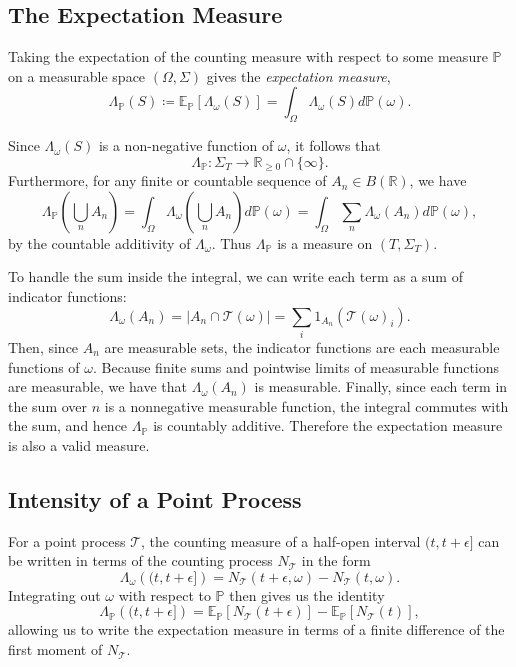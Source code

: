 \documentclass[honours,12pt]{unswthesis}
\numberwithin{equation}{section}
\begin{document}
\subsection{The Expectation Measure}
Taking the expectation of the counting measure with respect to some measure $\mathbb{P}$ on a measurable space $(\Omega,\Sigma)$ gives the \textit{expectation measure},
$$\Lambda_\mathbb{P}(S)\coloneq \mathbb{E}_\mathbb{P}\left[\Lambda_\omega(S)\right] = \int_\Omega \Lambda_\omega(S)d\mathbb{P}(\omega).$$

Since $\Lambda_\omega(S)$ is a non-negative function of $\omega$, it follows that $$\Lambda_{\mathbb{P}} : \Sigma_T \to \mathbb{R}_{\geq 0}\cap\{\infty\}.$$ Furthermore, for any finite or countable sequence of $A_n\in B(\mathbb{R})$, we have $$\Lambda_\mathbb{P}\left(\bigcup_n A_n\right) = \int_\Omega \Lambda_\omega\left(\bigcup_n A_n\right)d\mathbb{P}(\omega) = \int_\Omega \sum_n \Lambda_\omega(A_n) d\mathbb{P}(\omega),$$ by the countable additivity of $\Lambda_\omega$. Thus $\Lambda_\mathbb{P}$ is a measure on $(T,\Sigma_T)$.

To handle the sum inside the integral, we can write each term as a sum of indicator functions:
$$\Lambda_\omega(A_n) = \left\vert A_n\cap \mathcal{T}(\omega)\right\vert = \sum_i 1_{A_n}\left(\mathcal{T}(\omega)_i\right).$$
Then, since $A_n$ are measurable sets, the indicator functions are each measurable functions of $\omega$. Because finite sums and pointwise limits of measurable functions are measurable, we have that $\Lambda_\omega(A_n)$ is measurable.  Finally, since each term in the sum over $n$ is a nonnegative measurable function, the integral commutes with the sum, and hence $\Lambda_\mathbb{P}$ is countably additive. Therefore the expectation measure is also a valid measure.

\subsection{Intensity of a Point Process}
For a point process $\mathcal{T}$, the counting measure of a half-open interval $(t,t+\epsilon]$ can be written in terms of the counting process $N_\mathcal{T}$ in the form
$$\Lambda_\omega\left((t,t+\epsilon]\right) = N_\mathcal{T}(t+\epsilon,\omega) - N_\mathcal{T}(t,\omega).$$
Integrating out $\omega$ with respect to $\mathbb{P}$ then gives us the identity
$$\Lambda_\mathbb{P}\left((t,t+\epsilon]\right) = \mathbb{E}_\mathbb{P}\left[N_\mathcal{T}(t+\epsilon)\right] - \mathbb{E}_\mathbb{P}\left[N_\mathcal{T}(t)\right],$$
allowing us to write the expectation measure in terms of a finite difference of the first moment of $N_\mathcal{T}$.
\end{document}
